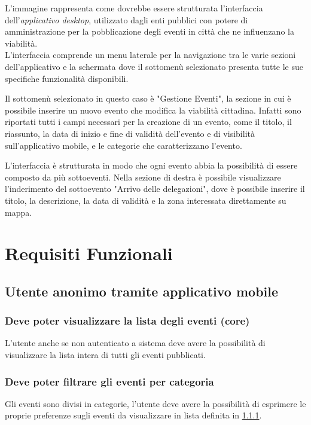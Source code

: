 \documentclass{article}
\begin{document}
L'immagine rappresenta come dovrebbe essere strutturata l'interfaccia dell'\textit{applicativo desktop}, utilizzato dagli enti pubblici con potere di amministrazione per la pobblicazione degli eventi in città che ne influenzano la viabilità.\\
L'interfaccia comprende un menu laterale per la navigazione tra le varie sezioni dell'applicativo e la schermata dove il sottomenù selezionato presenta tutte le sue specifiche funzionalità disponibili.

Il sottomenù selezionato in questo caso è "Gestione Eventi", la sezione in cui è possibile inserire un nuovo evento che modifica la viabilità cittadina. Infatti sono riportati tutti i campi necessari per la creazione di un evento, come il titolo, il riassunto, la data di inizio e fine di validità dell'evento e di visibilità sull'applicativo mobile, e le categorie che caratterizzano l'evento.

L'interfaccia è strutturata in modo che ogni evento abbia la possibilità di essere composto da più sottoeventi. Nella sezione di destra è possibile visualizzare l'inderimento del sottoevento "Arrivo delle delegazioni", dove è possibile inserire il titolo, la descrizione, la data di validità e la zona interessata direttamente su mappa.\\

\clearpage

\section{Requisiti Funzionali}

\subsection{Utente anonimo tramite applicativo mobile}

\subsubsection{Deve poter visualizzare la lista degli eventi (core)}\label{Requirements:Lista}
L'utente anche se non autenticato a sistema deve avere la possibilità di visualizzare la lista intera di tutti gli eventi pubblicati.

\subsubsection{Deve poter filtrare gli eventi per categoria}
Gli eventi sono divisi in categorie, l'utente deve avere la possibilità di esprimere le proprie preferenze sugli eventi da visualizzare in lista definita in \ref{Requirements:Lista}.
\end{document}
